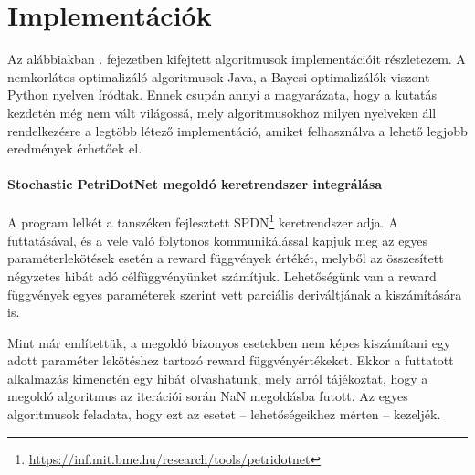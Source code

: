 \chapter{Implementációk}
\label{sec:implementaciok}
Az alábbiakban . fejezetben kifejtett algoritmusok implementációit részletezem. A nemkorlátos optimalizáló algoritmusok Java, a Bayesi optimalizálók viszont Python nyelven íródtak. Ennek csupán annyi a magyarázata, hogy a kutatás kezdetén még nem vált világossá, mely algoritmusokhoz milyen nyelveken áll rendelkezésre a legtöbb létező implementáció, amiket felhasználva a lehető legjobb eredmények érhetőek el.

\subsubsection{Stochastic PetriDotNet megoldó keretrendszer integrálása}
A program lelkét a tanszéken fejlesztett SPDN\footnote{\url{https://inf.mit.bme.hu/research/tools/petridotnet}}
keretrendszer adja. A futtatásával, és a vele való folytonos kommunikálással kapjuk meg az egyes paraméterlekötések esetén a reward függvények értékét, melyből az összesített négyzetes hibát adó célfüggvényünket számítjuk. Lehetőségünk van a reward függvények egyes paraméterek szerint vett parciális deriváltjának a kiszámítására is.

Mint már említettük, a megoldó bizonyos esetekben nem képes kiszámítani egy adott paraméter lekötéshez tartozó reward függvényértékeket. Ekkor a futtatott alkalmazás kimenetén egy hibát olvashatunk, mely arról tájékoztat, hogy a megoldó algoritmus az iterációi során NaN megoldásba futott. Az egyes algoritmusok feladata, hogy ezt az esetet -- lehetőségeikhez mérten -- kezeljék.

